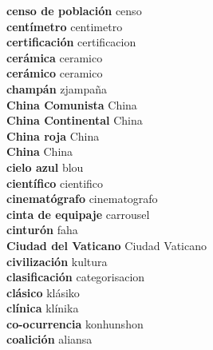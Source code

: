 \textbf{ censo de población  } censo \\
\textbf{ centímetro  } centimetro \\
\textbf{ certificación  } certificacion \\
\textbf{ cerámica  } ceramico \\
\textbf{ cerámico  } ceramico \\
\textbf{ champán  } zjampaña \\
\textbf{ China Comunista  } China \\
\textbf{ China Continental  } China \\
\textbf{ China roja  } China \\
\textbf{ China  } China \\
\textbf{ cielo azul  } blou \\
\textbf{ científico  } cientifico \\
\textbf{ cinematógrafo  } cinematografo \\
\textbf{ cinta de equipaje  } carrousel \\
\textbf{ cinturón  } faha \\
\textbf{ Ciudad del Vaticano  } Ciudad Vaticano \\
\textbf{ civilización  } kultura \\
\textbf{ clasificación  } categorisacion \\
\textbf{ clásico  } klásiko \\
\textbf{ clínica  } klínika \\
\textbf{ co-ocurrencia  } konhunshon \\
\textbf{ coalición  } aliansa \\
